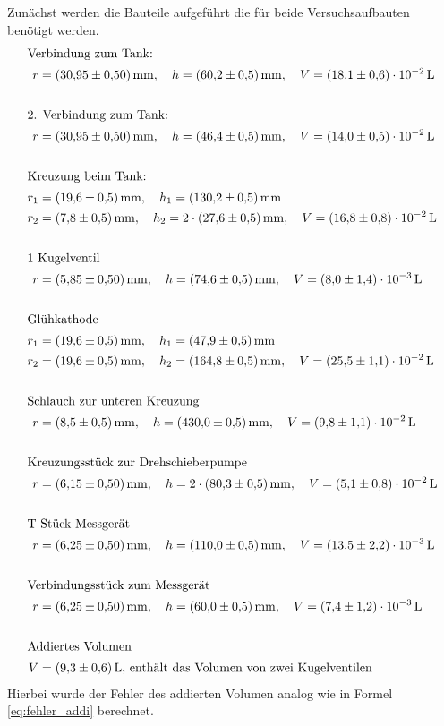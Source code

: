 Zunächst werden die Bauteile aufgeführt die für beide Versuchsaufbauten benötigt werden.
\begin{align*}
  \shortintertext{Verbindung zum Tank:}
  r&=\SI{30.95\pm 0.5}{\milli\meter}, \quad h=\SI{60.2\pm0.5}{\milli\meter}, \quad V=\SI{ 18.1\pm0.6 e-2}{\litre}\\
  \\
  \shortintertext{2. Verbindung zum Tank:}
  r&=\SI{30.95\pm 0.5}{\milli\meter}, \quad h=\SI{46.4\pm0.5}{\milli\meter}, \quad V=\SI{ 14.0\pm0.5 e-2}{\litre}\\
  \\
  \shortintertext{Kreuzung beim Tank:}
  r_1&=\SI{19.6\pm 0.5}{\milli\meter}, \quad h_1=\SI{130.2\pm0.5}{\milli\meter}\\
  r_2&=\SI{7.8\pm 0.5}{\milli\meter}, \quad h_2=2\cdot  \SI{27.6\pm0.5}{\milli\meter}, \quad V=\SI{ 16.8\pm0.8 e-2}{\litre}\\
  \\
  \shortintertext{1 Kugelventil}
  r&=\SI{5.85\pm 0.5}{\milli\meter}, \quad h=\SI{74.6\pm0.5}{\milli\meter}, \quad V=\SI{ 8.0\pm1.4 e-3}{\litre}\\
  \\
  \shortintertext{Glühkathode}
  r_1&=\SI{19.6\pm 0.5}{\milli\meter}, \quad h_1=\SI{47.9\pm0.5}{\milli\meter}\\
  r_2&=\SI{19.6\pm 0.5}{\milli\meter}, \quad h_2=\SI{164.8\pm0.5}{\milli\meter}, \quad V=\SI{ 25.5\pm1.1 e-2}{\litre}\\
  \\
  \shortintertext{Schlauch zur unteren Kreuzung}
  r&=\SI{8.5\pm 0.5}{\milli\meter}, \quad h=\SI{430\pm0.5}{\milli\meter}, \quad V=\SI{ 9.8\pm1.1 e-2}{\litre}\\
  \\
  \shortintertext{Kreuzungsstück zur Drehschieberpumpe}
  r&=\SI{6.15\pm 0.5}{\milli\meter}, \quad h=2\cdot\SI{80.3\pm0.5}{\milli\meter}, \quad V=\SI{ 5.1\pm0.8 e-2}{\litre}\\
  \\
  \shortintertext{T-Stück Messgerät}
  r&=\SI{6.25\pm 0.5}{\milli\meter}, \quad h=\SI{110\pm0.5}{\milli\meter}, \quad V=\SI{ 13.5\pm2.2 e-3}{\litre}\\
  \\
  \shortintertext{Verbindungsstück zum Messgerät}
  r&=\SI{6.25\pm 0.5}{\milli\meter}, \quad h=\SI{60\pm0.5}{\milli\meter}, \quad V=\SI{ 7.4\pm1.2 e-3}{\litre}\\
  \\
  \shortintertext{Addiertes Volumen}
  V&=\SI{ 9.3\pm0.6}{\litre},\,  \text{enthält das Volumen von zwei Kugelventilen}
\end{align*}
Hierbei wurde der Fehler des addierten Volumen analog wie in Formel \ref{eq:fehler_addi} berechnet.

